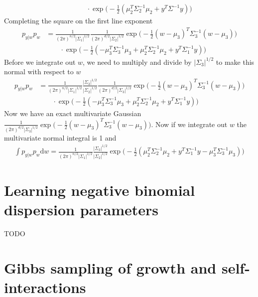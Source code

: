 \documentclass{article}
\begin{document}
\begin{appendices}
\begin{align}
    & \quad \quad \cdot \exp{\big(
      -\frac{1}{2} (\mu_2^T \Sigma_2^{-1} \mu_2 + y^T \Sigma^{-1} y)
    \big)}
\end{align}
Completing the square on the first line exponent
\begin{align}
  p_{y|w}p_w & =
    \frac{1}{(2 \pi)^{n/2} |\Sigma_1|^{1/2}}
    \frac{1}{(2 \pi)^{d/2} |\Sigma_2|^{1/2}}
    \exp{\big(
      -\frac{1}{2} (w - \mu_3)^T \Sigma_3^{-1} (w - \mu_3)
    \big)} \\
    & \quad \quad \cdot \exp{\big(
      -\frac{1}{2}(
        -\mu_3^T \Sigma_3^{-1} \mu_3 + \mu_2^T \Sigma_2^{-1} \mu_2
        + y^T \Sigma_1^{-1} y)
    \big)}
\end{align}
Before we integrate out $w$, we need to multiply and divide by $|\Sigma_3|^{1/2}$ to make this normal with respect to $w$
\begin{align}
  p_{y|w}p_w & =
    \frac{1}{(2 \pi)^{n/2} |\Sigma_1|^{1/2}}
    \frac{|\Sigma_3|^{1/2}}{|\Sigma_2|^{1/2}}
    \frac{1}{(2 \pi)^{d/2} |\Sigma_3|^{1/2}}
    \exp{\big(-\frac{1}{2}(w-\mu_3)^T \Sigma_3^{-1} (w-\mu_3) \big)} \\
    & \quad \quad \cdot \exp{\big(
    -\frac{1}{2}(
      -\mu_3^T \Sigma_3^{-1} \mu_3 + \mu_2^T \Sigma_2^{-1} \mu_2
      + y^T \Sigma_1^{-1} y)
    \big)}
\end{align}
Now we have an exact multivariate Gaussian $\frac{1}{(2 \pi)^{d/2} |\Sigma_3|^{1/2}} \exp{\big( -\frac{1}{2}(w - \mu_3)^T \Sigma_3^{-1} (w - \mu_3) \big)}$. Now if we integrate out $w$ the multivariate normal integral is 1 and
\begin{align}
  \label{eqn:marginalization}
  \int p_{y|w}p_w \text{d}w =
    \frac{1}{(2 \pi)^{n/2} | \Sigma_1 |^{1/2}}
    \frac{| \Sigma_3 |^{1/2}}{| \Sigma_2 |^{1/2}}
    \exp{\big(
      -\frac{1}{2}(
        \mu_2^T \Sigma_2^{-1} \mu_2 + y^T \Sigma_1^{-1} y - \mu_3^T \Sigma_3^{-1} \mu_3
      )
    \big)}
\end{align}

\section{Learning negative binomial dispersion parameters}
\label{appendix:learning negbin dispersion params}
TODO

\section{Gibbs sampling of growth and self-interactions}
\label{appendix:sampling growth and si}

\end{appendices}
\end{document}
